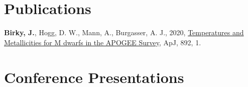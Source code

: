 \documentclass[margin,line]{resume}
\begin{document}
\begin{resume}

\section{\mysidestyle \textcolor{bcolor}{Publications}}
\textbf{Birky, J.}, Hogg, D. W., Mann, A., Burgasser, A. J., 2020, \href{https://arxiv.org/abs/2001.04962}{Temperatures and Metallicities for M dwarfs in the APOGEE Survey}, ApJ, 892, 1.


\section{\mysidestyle \textcolor{bcolor}{Conference Presentations}}




\end{resume}
\end{document}
